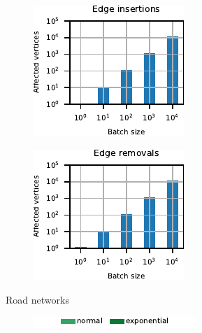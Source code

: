\begin{figure}[t]
\centering
\begin{subfigure}[b]{.5\textwidth}
\begin{subfigure}[b]{.5\textwidth}
\centering
\includegraphics[width=.9\textwidth]{sources/plots/dyn-mwm/affected-road-insertion.pdf}
\end{subfigure}\hfill
\begin{subfigure}[b]{.5\textwidth}
\centering
\includegraphics[width=.9\textwidth]{sources/plots/dyn-mwm/affected-road-removal.pdf}
\end{subfigure}
\caption{Road networks}
\end{subfigure}\hfill
\begin{subfigure}[b]{.5\textwidth}
\begin{subfigure}[t]{\textwidth}
\centering
\includegraphics{sources/plots/dyn-mwm/legend-cplx.pdf}
\end{subfigure}


\end{subfigure}
\end{figure}
